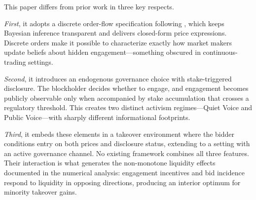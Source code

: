 This paper differs from prior work in three key respects.

\emph{First}, it adopts a discrete order-flow specification following \citet{EdmansGoldsteinJiang2015}, which keeps Bayesian inference transparent and delivers closed-form price expressions. Discrete orders make it possible to characterize exactly how market makers update beliefs about hidden engagement---something obscured in continuous-trading settings.

\emph{Second}, it introduces an endogenous governance choice with stake-triggered disclosure. The blockholder decides whether to engage, and engagement becomes publicly observable only when accompanied by stake accumulation that crosses a regulatory threshold. This creates two distinct activism regimes---Quiet Voice and Public Voice---with sharply different informational footprints.

\emph{Third}, it embeds these elements in a takeover environment where the bidder conditions entry on both prices and disclosure status, extending \citet{EdmansGoldsteinJiang2012} to a setting with an active governance channel. No existing framework combines all three features. Their interaction is what generates the non-monotone liquidity effects documented in the numerical analysis: engagement incentives and bid incidence respond to liquidity in opposing directions, producing an interior optimum for minority takeover gains.
